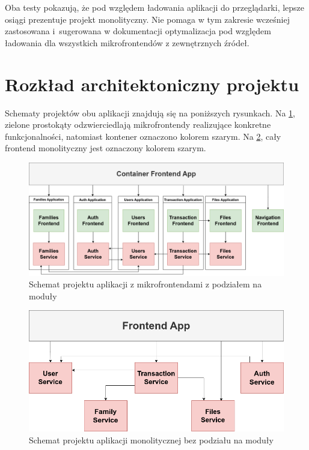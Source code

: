 \documentclass{SGGW-thesis}
\begin{document}
{    Oba testy pokazują, że pod względem ładowania aplikacji do przeglądarki, lepsze osiągi prezentuje projekt monolityczny. Nie pomaga w tym zakresie wcześniej zastosowana i~sugerowana w dokumentacji \cite{singlespa} optymalizacja pod względem ładowania dla wszystkich mikrofrontendów z zewnętrznych źródeł.

  \section{Rozkład architektoniczny projektu}
  Schematy projektów obu aplikacji znajdują się na poniższych rysunkach. Na \cref{fig:monolith_fe_diagram}, zielone prostokąty odzwierciedlają mikrofrontendy realizujące konkretne funkcjonalności, natomiast kontener oznaczono kolorem szarym. Na \cref{fig:microservices_fe_diagram}, cały frontend monolityczny jest oznaczony kolorem szarym.

  \begin{figure}[h!]
    \centering
    \captionsetup{justification=centering}
    \includegraphics[width=\textwidth]{microfrontend-app-architecture.png}
    \caption{Schemat projektu aplikacji z mikrofrontendami z podziałem na moduły}
    \label{fig:monolith_fe_diagram}
  \end{figure}

  \pagebreak

  \begin{figure}[h]
    \centering
    \captionsetup{justification=centering}
    \includegraphics[width=\textwidth]{microservices-app-diagram.png}
    \caption{Schemat projektu aplikacji monolitycznej bez podziału na moduły}
    \label{fig:microservices_fe_diagram}
  \end{figure}

}
\end{document}
